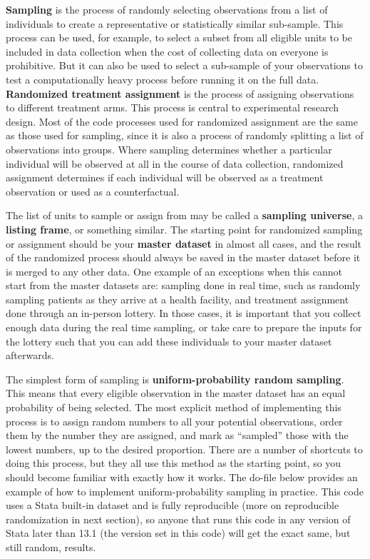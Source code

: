 \textbf{Sampling} is the process of randomly selecting observations
from a list of individuals to create a representative or statistically similar sub-sample.
This process can be used, for example, to select a subset from all eligible units
to be included in data collection when the cost of collecting data on everyone is prohibitive.
But it can also be used to select a sub-sample of your observations to test a computationally heavy process
before running it on the full data.
\textbf{Randomized treatment assignment} is the process of assigning observations to different treatment arms.
This process is central to experimental research design.
Most of the code processes used for randomized assignment are the same as those used for sampling,
since it is also a process of randomly splitting a list of observations into groups.
Where sampling determines whether a particular individual
will be observed at all in the course of data collection,
randomized assignment determines if each individual will be observed
as a treatment observation or used as a counterfactual.

The list of units to sample or assign from may be called a \textbf{sampling universe},
a \textbf{listing frame}, or something similar.
The starting point for randomized sampling or assignment
should be your \textbf{master dataset} in almost all cases,
and the result of the randomized process should always be saved in the master dataset
before it is merged to any other data.
One example of an exceptions
when this cannot start from the master datasets are:
sampling done in real time, such as randomly sampling patients
as they arrive at a health facility, and 
treatment assignment done through an in-person lottery.
In those cases,
it is important that you collect enough data
during the real time sampling,
or take care to prepare the inputs for the lottery
such that you can add these individuals
to your master dataset afterwards.

The simplest form of sampling is
\textbf{uniform-probability random sampling}.
This means that every eligible observation in the master dataset
has an equal probability of being selected.
The most explicit method of implementing this process
is to assign random numbers to all your potential observations,
order them by the number they are assigned,
and mark as ``sampled'' those with the lowest numbers, up to the desired proportion.
There are a number of shortcuts to doing this process,
but they all use this method as the starting point,
so you should become familiar with exactly how it works.
The do-file below provides an example of
how to implement uniform-probability sampling in practice.
This code uses a Stata built-in dataset and is fully reproducible
(more on reproducible randomization in next section),
so anyone that runs this code in any version of Stata later than 13.1
(the version set in this code)
will get the exact same, but still random, results.

